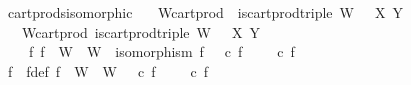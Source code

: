 \begin{isabellebody}
\isamarkupfalse%
\ cart{\isacharunderscore}{\kern0pt}prods{\isacharunderscore}{\kern0pt}isomorphic{\isacharcolon}{\kern0pt}\isanewline
\ \ \ W{\isacharunderscore}{\kern0pt}cart{\isacharunderscore}{\kern0pt}prod{\isacharcolon}{\kern0pt}\ \ {\isachardoublequoteopen}is{\isacharunderscore}{\kern0pt}cart{\isacharunderscore}{\kern0pt}prod{\isacharunderscore}{\kern0pt}triple\ {\isacharparenleft}{\kern0pt}W{\isacharcomma}{\kern0pt}\ {\isasympi}\ {\isasympi}\ X\ Y{\isachardoublequoteclose}\isanewline
\ \ \ W{\isacharprime}{\kern0pt}{\isacharunderscore}{\kern0pt}cart{\isacharunderscore}{\kern0pt}prod{\isacharcolon}{\kern0pt}\ {\isachardoublequoteopen}is{\isacharunderscore}{\kern0pt}cart{\isacharunderscore}{\kern0pt}prod{\isacharunderscore}{\kern0pt}triple\ {\isacharparenleft}{\kern0pt}W{\isacharprime}{\kern0pt}{\isacharcomma}{\kern0pt}\ {\isasympi}{\isacharprime}{\kern0pt}\ {\isasympi}{\isacharprime}{\kern0pt}\ X\ Y{\isachardoublequoteclose}\isanewline
\ \ \ {\isachardoublequoteopen}{\isasymexists}\ f{\isachardot}{\kern0pt}\ f\ {\isacharcolon}{\kern0pt}\ W\ {\isasymrightarrow}\ W{\isacharprime}{\kern0pt}\ {\isasymand}\ isomorphism\ f\ {\isasymand}\ {\isasympi}{\isacharprime}{\kern0pt}\ {\isasymcirc}\isactrlsub c\ f\ {\isacharequal}{\kern0pt}\ {\isasympi}\ {\isasymand}\ {\isasympi}{\isacharprime}{\kern0pt}\ {\isasymcirc}\isactrlsub c\ f\ {\isacharequal}{\kern0pt}\ {\isasympi}\isanewline
%
\isadelimproof
%
\endisadelimproof
%
\isatagproof
{}\isamarkupfalse%
\ {\isacharminus}{\kern0pt}\isanewline
\ \ \isamarkupfalse%
\ f\ \ f{\isacharunderscore}{\kern0pt}def{\isacharcolon}{\kern0pt}\ {\isachardoublequoteopen}f\ {\isacharcolon}{\kern0pt}\ W\ {\isasymrightarrow}\ W{\isacharprime}{\kern0pt}\ {\isasymand}\ {\isasympi}{\isacharprime}{\kern0pt}\ {\isasymcirc}\isactrlsub c\ f\ {\isacharequal}{\kern0pt}\ {\isasympi}\ {\isasymand}\ {\isasympi}{\isacharprime}{\kern0pt}\ {\isasymcirc}\isactrlsub c\ f\ {\isacharequal}{\kern0pt}\ {\isasympi}\isanewline
\ \ \ \ \isamarkupfalse%

\end{isabellebody}
